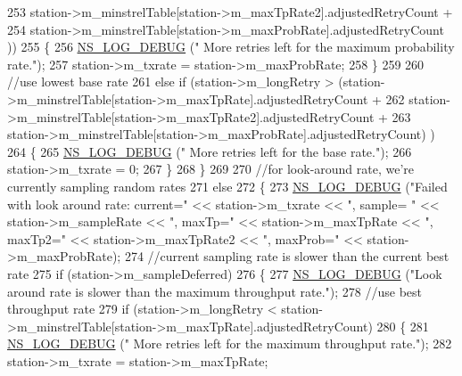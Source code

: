 \begin{DoxyCode}
253                                         station->m\_minstrelTable[station->m\_maxTpRate2].adjustedRetryCount 
      +
254                                         station->m\_minstrelTable[station->m\_maxProbRate].adjustedRetryCount
      ))
255         \{
256           \hyperlink{group__logging_ga413f1886406d49f59a6a0a89b77b4d0a}{NS\_LOG\_DEBUG} (\textcolor{stringliteral}{" More retries left for the maximum probability rate."});
257           station->m\_txrate = station->m\_maxProbRate;
258         \}
259 
260       \textcolor{comment}{//use lowest base rate}
261       \textcolor{keywordflow}{else} \textcolor{keywordflow}{if} (station->m\_longRetry > (station->m\_minstrelTable[station->m\_maxTpRate].adjustedRetryCount +
262                                        station->m\_minstrelTable[station->m\_maxTpRate2].adjustedRetryCount +
263                                        station->m\_minstrelTable[station->m\_maxProbRate].adjustedRetryCount)
      )
264         \{
265           \hyperlink{group__logging_ga413f1886406d49f59a6a0a89b77b4d0a}{NS\_LOG\_DEBUG} (\textcolor{stringliteral}{" More retries left for the base rate."});
266           station->m\_txrate = 0;
267         \}
268     \}
269 
270   \textcolor{comment}{//for look-around rate, we're currently sampling random rates}
271   \textcolor{keywordflow}{else}
272     \{
273       \hyperlink{group__logging_ga413f1886406d49f59a6a0a89b77b4d0a}{NS\_LOG\_DEBUG} (\textcolor{stringliteral}{"Failed with look around rate: current="} << station->m\_txrate << \textcolor{stringliteral}{", sample=
      "} << station->m\_sampleRate << \textcolor{stringliteral}{", maxTp="} << station->m\_maxTpRate << \textcolor{stringliteral}{", maxTp2="} << station->m\_maxTpRate2 << \textcolor{stringliteral}{
      ", maxProb="} << station->m\_maxProbRate);
274       \textcolor{comment}{//current sampling rate is slower than the current best rate}
275       \textcolor{keywordflow}{if} (station->m\_sampleDeferred)
276         \{
277           \hyperlink{group__logging_ga413f1886406d49f59a6a0a89b77b4d0a}{NS\_LOG\_DEBUG} (\textcolor{stringliteral}{"Look around rate is slower than the maximum throughput rate."});
278           \textcolor{comment}{//use best throughput rate}
279           \textcolor{keywordflow}{if} (station->m\_longRetry < station->m\_minstrelTable[station->m\_maxTpRate].adjustedRetryCount)
280             \{
281               \hyperlink{group__logging_ga413f1886406d49f59a6a0a89b77b4d0a}{NS\_LOG\_DEBUG} (\textcolor{stringliteral}{" More retries left for the maximum throughput rate."});
282               station->m\_txrate = station->m\_maxTpRate;

\end{DoxyCode}
